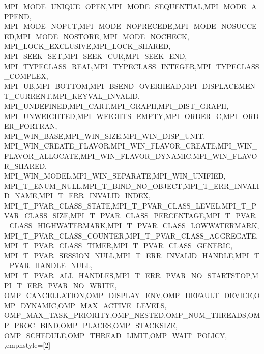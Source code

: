 {{{{{    MPI_MODE_UNIQUE_OPEN,MPI_MODE_SEQUENTIAL,MPI_MODE_APPEND,
    MPI_MODE_NOPUT,MPI_MODE_NOPRECEDE,MPI_MODE_NOSUCCEED,MPI_MODE_NOSTORE,
    MPI_MODE_NOCHECK, MPI_LOCK_EXCLUSIVE,MPI_LOCK_SHARED,
    MPI_SEEK_SET,MPI_SEEK_CUR,MPI_SEEK_END,
    MPI_TYPECLASS_REAL,MPI_TYPECLASS_INTEGER,MPI_TYPECLASS_COMPLEX,
    MPI_UB,MPI_BOTTOM,MPI_BSEND_OVERHEAD,MPI_DISPLACEMENT_CURRENT,MPI_KEYVAL_INVALID,
    MPI_UNDEFINED,MPI_CART,MPI_GRAPH,MPI_DIST_GRAPH,
    MPI_UNWEIGHTED,MPI_WEIGHTS_EMPTY,MPI_ORDER_C,MPI_ORDER_FORTRAN,
    MPI_WIN_BASE,MPI_WIN_SIZE,MPI_WIN_DISP_UNIT,
    MPI_WIN_CREATE_FLAVOR,MPI_WIN_FLAVOR_CREATE,MPI_WIN_FLAVOR_ALLOCATE,MPI_WIN_FLAVOR_DYNAMIC,MPI_WIN_FLAVOR_SHARED,
    MPI_WIN_MODEL,MPI_WIN_SEPARATE,MPI_WIN_UNIFIED,
    MPI_T_ENUM_NULL,MPI_T_BIND_NO_OBJECT,MPI_T_ERR_INVALID_NAME,MPI_T_ERR_INVALID_INDEX,
    MPI_T_PVAR_CLASS_STATE,MPI_T_PVAR_CLASS_LEVEL,MPI_T_PVAR_CLASS_SIZE,MPI_T_PVAR_CLASS_PERCENTAGE,MPI_T_PVAR_CLASS_HIGHWATERMARK,MPI_T_PVAR_CLASS_LOWWATERMARK,MPI_T_PVAR_CLASS_COUNTER,MPI_T_PVAR_CLASS_AGGREGATE,MPI_T_PVAR_CLASS_TIMER,MPI_T_PVAR_CLASS_GENERIC,
    MPI_T_PVAR_SESSION_NULL,MPI_T_ERR_INVALID_HANDLE,MPI_T_PVAR_HANDLE_NULL,
    MPI_T_PVAR_ALL_HANDLES,MPI_T_ERR_PVAR_NO_STARTSTOP,MPI_T_ERR_PVAR_NO_WRITE,
    OMP_CANCELLATION,OMP_DISPLAY_ENV,OMP_DEFAULT_DEVICE,OMP_DYNAMIC,OMP_MAX_ACTIVE_LEVELS,
    OMP_MAX_TASK_PRIORITY,OMP_NESTED,OMP_NUM_THREADS,OMP_PROC_BIND,OMP_PLACES,OMP_STACKSIZE,
    OMP_SCHEDULE,OMP_THREAD_LIMIT,OMP_WAIT_POLICY,
  },emphstyle={[2]\color{green!40!black}}
}

}}}

